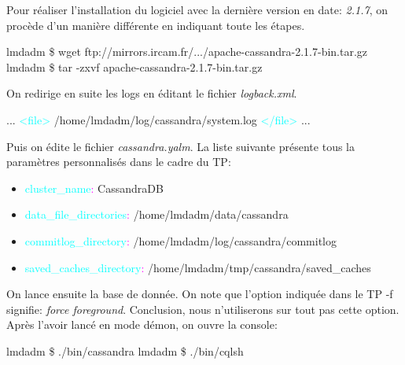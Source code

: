 \par Pour réaliser l'installation du logiciel avec la dernière version en date: \textit{2.1.7},\newline
on procède d'un manière différente en indiquant toute les étapes.\newline
\begin{tt}
lmdadm \$ wget ftp://mirrors.ircam.fr/.../apache-cassandra-2.1.7-bin.tar.gz \newline
lmdadm \$ tar -zxvf apache-cassandra-2.1.7-bin.tar.gz \newline
\end{tt}
On redirige en suite les logs en éditant le fichier \textit{logback.xml}. \newline
\begin{tt}
... \newline
\textcolor{cyan}{<file>} /home/lmdadm/log/cassandra/system.log \textcolor{cyan}{</file>} \newline
... \newline
\end{tt}
Puis on édite le fichier \textit{cassandra.yalm}. La liste suivante présente tous la paramètres personnalisés dans le cadre du TP:
\begin{itemize}
\item \textcolor{cyan}{cluster\_name}\textcolor{magenta}{:} CassandraDB
\item \textcolor{cyan}{data\_file\_directories}\textcolor{magenta}{:} /home/lmdadm/data/cassandra
\item \textcolor{cyan}{commitlog\_directory}\textcolor{magenta}{:} /home/lmdadm/log/cassandra/commitlog
\item \textcolor{cyan}{saved\_caches\_directory}\textcolor{magenta}{:} /home/lmdadm/tmp/cassandra/saved\_caches
\end{itemize}
On lance ensuite la base de donnée. On note que l'option indiquée dans le TP -f
signifie: \textit{force foreground}. Conclusion, nous n'utiliserons sur tout pas cette option. Après l'avoir lancé en mode démon, on ouvre la console: \newline
\begin{tt}
lmdadm \$ ./bin/cassandra \newline
lmdadm \$ ./bin/cqlsh \newline
\end{tt}
